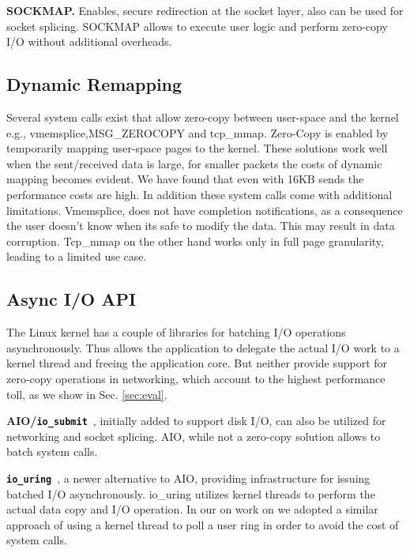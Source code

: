 \noindent \textbf{SOCKMAP\cite{sockmap}.} Enables, secure redirection at the socket layer, also can be used for socket splicing\cite{cloudflare_sockmap}. SOCKMAP allows to execute user logic and perform zero-copy I/O without additional overheads.

\subsection{Dynamic Remapping}
Several system calls exist that allow zero-copy between user-space and the kernel e.g., vmemsplice\cite{vmsplice},MSG\_ZEROCOPY\cite{desendmsg} and tcp\_mmap\cite{tcp_mmap}.
Zero-Copy is enabled by temporarily mapping user-space pages to the kernel. These solutions work well when the sent/received data is large, for smaller packets the costs of dynamic mapping becomes evident. We have found that even with 16KB sends the performance costs are high. In addition these system calls come with additional limitations. Vmemsplice, does not have completion notifications, as a consequence the user doesn't know when its safe to modify the data. This may result in data corruption. Tcp\_mmap on the other hand works only in full page granularity, leading to a limited use case. 

\subsection{Async I/O API}
The Linux kernel has a couple of libraries for batching I/O operations asynchronously. Thus allows the application to delegate the actual I/O work to a kernel thread and freeing the application core.
But neither provide support for zero-copy operations in networking, which account to the highest performance toll, as we show in Sec. \ref{sec:eval}.

\noindent \textbf{AIO/\texttt{io\_submit}}~\cite{aio}, initially added to support disk I/O, can also be utilized for networking and socket splicing\cite{cloudflare_aio}. AIO, while not a zero-copy solution allows to batch system calls.%

\noindent \textbf{\texttt{io\_uring}}~\cite{io-uring}, a newer alternative to AIO, providing infrastructure for issuing batched I/O asynchronously. io\_uring utilizes kernel threads to perform the actual data copy and I/O operation. In our on work on \oursys we adopted a similar approach of using a kernel thread to poll a user ring in order to avoid the cost of system calls.

